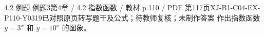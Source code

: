 \par\noindent\begin{minipage}{\linewidth}
\begin{bankitem}{4.2 例题 例题3}{第4章 / 4.2 指数函数 / 教材 p.110 / PDF 第117页}{XJ-B1-C04-EX-P110-Y0319}{已对照原页转写题干及公式；待教师复核；未制作答案}
作出指数函数 $y=3^x$ 和 $y=10^x$ 的图象。
\end{bankitem}
\end{minipage}\par\medskip
